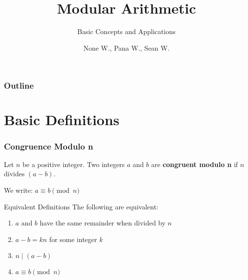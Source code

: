 \documentclass[10pt]{beamer}
\title{Modular Arithmetic}
\subtitle{Basic Concepts and Applications}
\author[Wanitchollakit]{None W., Pana W., Sean W.}
\date{}
\begin{document}
\begin{frame}
    \titlepage
\end{frame}

\begin{frame}
    \frametitle{Outline}
    \tableofcontents
\end{frame}


\section{Basic Definitions}

\begin{frame}
    \frametitle{Congruence Modulo n}
    \begin{definition}
        Let $n$ be a positive integer. Two integers $a$ and $b$ are \textbf{congruent modulo n} if $n$ divides $(a - b)$.

        We write: $a \equiv b \pmod{n}$
    \end{definition}

    \vspace{0.5cm}

    \begin{block}{Equivalent Definitions}
        The following are equivalent:
        \begin{enumerate}
            \item $a$ and $b$ have the same remainder when divided by $n$
            \item $a - b = kn$ for some integer $k$
            \item $n \mid (a - b)$
            \item $a \equiv b \pmod{n}$
        \end{enumerate}
    \end{block}
\end{frame}
\end{document}
